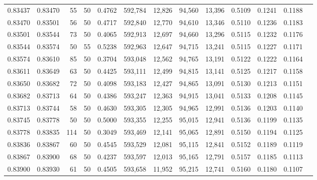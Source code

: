 \begin{tabular}{rrrrrrrrrrrrr}
0.83437 & 0.83470 &    55 &  50 &                                     0.4762 & 592,784 &  12,826 &  94,560 &  13,396 & 0.5109 & 0.1241 & 0.1188 \\
0.83470 & 0.83501 &    56 &  50 &                                     0.4717 & 592,840 &  12,770 &  94,610 &  13,346 & 0.5110 & 0.1236 & 0.1183 \\
0.83501 & 0.83544 &    73 &  50 &                                     0.4065 & 592,913 &  12,697 &  94,660 &  13,296 & 0.5115 & 0.1232 & 0.1176 \\
0.83544 & 0.83574 &    50 &  55 &                                     0.5238 & 592,963 &  12,647 &  94,715 &  13,241 & 0.5115 & 0.1227 & 0.1171 \\
0.83574 & 0.83610 &    85 &  50 &                                     0.3704 & 593,048 &  12,562 &  94,765 &  13,191 & 0.5122 & 0.1222 & 0.1164 \\
0.83611 & 0.83649 &    63 &  50 &                                     0.4425 & 593,111 &  12,499 &  94,815 &  13,141 & 0.5125 & 0.1217 & 0.1158 \\
0.83650 & 0.83682 &    72 &  50 &                                     0.4098 & 593,183 &  12,427 &  94,865 &  13,091 & 0.5130 & 0.1213 & 0.1151 \\
0.83682 & 0.83713 &    64 &  50 &                                     0.4386 & 593,247 &  12,363 &  94,915 &  13,041 & 0.5133 & 0.1208 & 0.1145 \\
0.83713 & 0.83744 &    58 &  50 &                                     0.4630 & 593,305 &  12,305 &  94,965 &  12,991 & 0.5136 & 0.1203 & 0.1140 \\
0.83745 & 0.83778 &    50 &  50 &                                     0.5000 & 593,355 &  12,255 &  95,015 &  12,941 & 0.5136 & 0.1199 & 0.1135 \\
0.83778 & 0.83835 &   114 &  50 &                                     0.3049 & 593,469 &  12,141 &  95,065 &  12,891 & 0.5150 & 0.1194 & 0.1125 \\
0.83836 & 0.83867 &    60 &  50 &                                     0.4545 & 593,529 &  12,081 &  95,115 &  12,841 & 0.5152 & 0.1189 & 0.1119 \\
0.83867 & 0.83900 &    68 &  50 &                                     0.4237 & 593,597 &  12,013 &  95,165 &  12,791 & 0.5157 & 0.1185 & 0.1113 \\
0.83900 & 0.83930 &    61 &  50 &                                     0.4505 & 593,658 &  11,952 &  95,215 &  12,741 & 0.5160 & 0.1180 & 0.1107 \\

\end{tabular}
